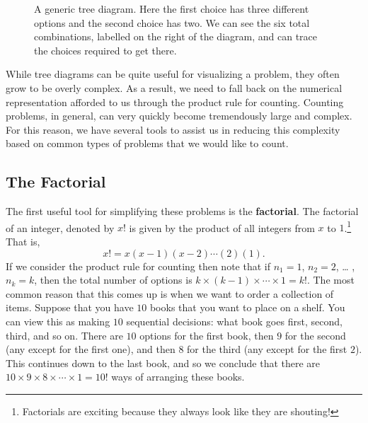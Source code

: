 \documentclass[
  letterpaper,
  DIV=11,
  numbers=noendperiod]{scrreprt}
\theoremstyle{definition}
\theoremstyle{definition}
\theoremstyle{definition}
\theoremstyle{remark}
\begin{document}
\begin{figure}[H]

\caption{\label{fig-tree-diagram-general}A generic tree diagram. Here
the first choice has three different options and the second choice has
two. We can see the six total combinations, labelled on the right of the
diagram, and can trace the choices required to get there.}


\end{figure}%

While tree diagrams can be quite useful for visualizing a problem, they
often grow to be overly complex. As a result, we need to fall back on
the numerical representation afforded to us through the product rule for
counting. Counting problems, in general, can very quickly become
tremendously large and complex. For this reason, we have several tools
to assist us in reducing this complexity based on common types of
problems that we would like to count.

\subsection{The Factorial}\label{the-factorial}

The first useful tool for simplifying these problems is the
\textbf{factorial}. The factorial of an integer, denoted by \(x!\) is
given by the product of all integers from \(x\) to \(1\).\footnote{Factorials
  are exciting because they always look like they are shouting!} That
is, \[x! = x(x-1)(x-2)\cdots(2)(1).\] If we consider the product rule
for counting then note that if \(n_1=1\), \(n_2=2\), \ldots{} ,
\(n_k = k\), then the total number of options is
\(k\times(k-1)\times\cdots\times 1 = k!\). The most common reason that
this comes up is when we want to order a collection of items. Suppose
that you have \(10\) books that you want to place on a shelf. You can
view this as making \(10\) sequential decisions: what book goes first,
second, third, and so on. There are \(10\) options for the first book,
then \(9\) for the second (any except for the first one), and then \(8\)
for the third (any except for the first \(2\)). This continues down to
the last book, and so we conclude that there are
\(10\times9\times8\times\cdots\times1 = 10!\) ways of arranging these
books.
\end{document}
